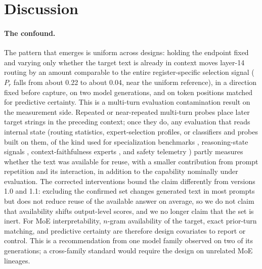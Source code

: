 \documentclass[10pt,a4paper,twocolumn]{article}
\begin{document}
\section{Discussion}\label{sec:discussion}

\paragraph{The confound.}
The pattern that emerges is uniform across designs: holding the endpoint fixed
and varying only whether the target text is already in context moves
layer-14 routing by an amount comparable to the entire register-specific
selection signal (\(P_r\) falls from about 0.22 to about 0.04, near the
uniform reference), in a direction fixed before capture, on two model
generations, and on token positions matched for predictive certainty. This is
a multi-turn evaluation contamination result on the measurement side.
Repeated or near-repeated multi-turn probes place later target strings in the
preceding context; once they do, any evaluation that reads internal state
(routing statistics, expert-selection profiles, or classifiers and probes
built on them, of the kind used for specialization benchmarks
\cite{wang2026dbes}, reasoning-state signals \cite{chen2026},
context-faithfulness experts \cite{bai2025}, and safety telemetry
\cite{lv2026}) partly measures whether the text was available for reuse,
with a smaller contribution from prompt repetition and its interaction, in
addition to the capability nominally under evaluation. The corrected
interventions bound the claim differently from versions 1.0 and 1.1:
excluding the confirmed set changes generated text in most prompts but does
not reduce reuse of the available answer on average, so we do not claim
that availability shifts output-level scores, and we no longer claim that
the set is inert.
For MoE interpretability, \(n\)-gram availability of the target, exact
prior-turn matching, and predictive certainty are therefore design covariates
to report or control. This is a recommendation from one model family observed
on two of its generations; a cross-family standard would require the design
on unrelated MoE lineages.
\end{document}
